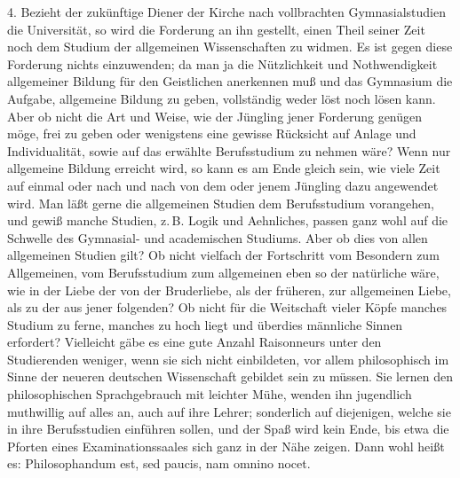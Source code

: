 4. Bezieht der zukünftige Diener der Kirche nach vollbrachten Gymnasialstudien die Universität, so wird die
Forderung an ihn gestellt, einen Theil seiner Zeit noch dem Studium der allgemeinen Wissenschaften zu widmen. Es ist gegen diese Forderung nichts einzuwenden; da man ja die Nützlichkeit und Nothwendigkeit allgemeiner Bildung für den Geistlichen anerkennen muß und das Gymnasium die Aufgabe, allgemeine Bildung zu geben, vollständig weder löst noch lösen kann. Aber ob nicht die Art und Weise, wie der Jüngling jener Forderung genügen möge, frei zu geben oder wenigstens eine gewisse Rücksicht auf Anlage und Individualität, sowie auf das erwählte Berufsstudium zu nehmen wäre? Wenn nur allgemeine Bildung erreicht wird, so kann es am Ende gleich sein, wie viele Zeit auf einmal oder nach und nach von dem oder jenem Jüngling dazu angewendet wird. Man läßt gerne die allgemeinen Studien dem Berufsstudium vorangehen, und gewiß manche Studien, z.\,B. Logik und Aehnliches, passen ganz wohl auf die Schwelle des Gymnasial- und academischen Studiums. Aber ob dies von allen allgemeinen Studien gilt? Ob nicht vielfach der Fortschritt vom Besondern zum Allgemeinen, vom Berufsstudium zum allgemeinen eben so der natürliche wäre, wie in der Liebe der von der Bruderliebe, als der früheren, zur allgemeinen Liebe, als zu der aus jener folgenden? Ob nicht für die Weitschaft vieler Köpfe manches Studium zu ferne, manches zu hoch liegt und überdies männliche Sinnen erfordert? Vielleicht gäbe es eine gute Anzahl Raisonneurs unter den Studierenden weniger, wenn sie sich nicht einbildeten, vor allem philosophisch im Sinne der neueren deutschen Wissenschaft gebildet sein zu müssen. Sie lernen den
philosophischen Sprachgebrauch mit leichter Mühe, wenden ihn jugendlich muthwillig auf alles an, auch auf ihre Lehrer; sonderlich auf diejenigen, welche sie in ihre Berufsstudien einführen sollen, und der Spaß wird kein Ende, bis etwa die Pforten eines Examinationssaales sich ganz in der Nähe zeigen. Dann wohl heißt es: Philosophandum est, sed paucis, nam omnino nocet.

